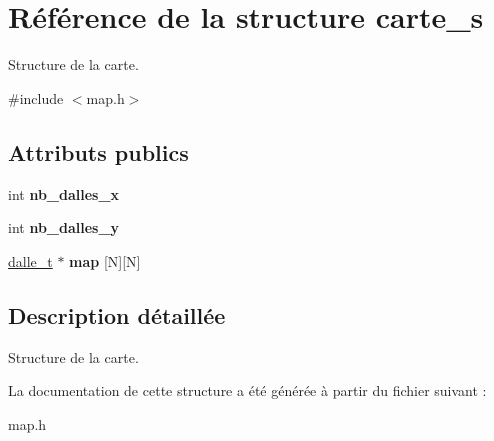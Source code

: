 \hypertarget{structcarte__s}{}\section{Référence de la structure carte\+\_\+s}
\label{structcarte__s}


Structure de la carte.  




{\ttfamily \#include $<$map.\+h$>$}

\subsection*{Attributs publics}
\begin{DoxyCompactItemize}
\item 
\mbox{\label{structcarte__s_a85693e9aff5af8dd84610b5c705314f1}} 
int {\bfseries nb\+\_\+dalles\+\_\+x}
\item 
\mbox{\label{structcarte__s_a7cd6880b4e2ccb2c05a81fc899daccc4}} 
int {\bfseries nb\+\_\+dalles\+\_\+y}
\item 
\mbox{\label{structcarte__s_a502419aacade5e05e1b5131c88016472}} 
\mbox{\hyperlink{structdalle__s}{dalle\+\_\+t}} $\ast$ {\bfseries map} \mbox{[}N\mbox{]}\mbox{[}N\mbox{]}
\end{DoxyCompactItemize}


\subsection{Description détaillée}
Structure de la carte. 

La documentation de cette structure a été générée à partir du fichier suivant \+:\begin{DoxyCompactItemize}
\item 
map.\+h\end{DoxyCompactItemize}
